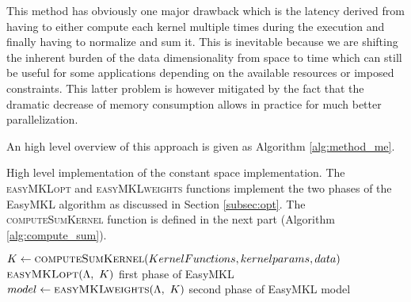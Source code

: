 This method has obviously one major drawback which is the latency derived from
having to either compute each kernel multiple times during the execution and
finally having to normalize and sum it.
This is inevitable because we are shifting the inherent burden of the data dimensionality
from space to time which can still be useful for some applications
depending on the available resources or imposed constraints.
This latter problem is however mitigated by the fact that the dramatic decrease
of memory consumption allows in practice for much better parallelization.

An high level overview of this approach is given as Algorithm \ref{alg:method_me}.
\begin{algorithm}
    \caption{
        High level implementation of the constant space implementation.
        The \textsc{easyMKLopt} and \textsc{easyMKLweights} functions implement
        the two phases of the EasyMKL algorithm as discussed in Section \ref{subsec:opt}.
        The \textsc{computeSumKernel} function is defined in the next part
        (Algorithm \ref{alg:compute_sum}).
    }

    \label{alg:method_me}
    \begin{algorithmic}[1]
                    \State $K \gets \Call{computeSumKernel}{KernelFunctions,kernelparams,data}$
                    \State $\Call{easyMKLopt}{\Lambda,~K}$
                    \Comment first phase of EasyMKL
                    \State $model \gets \Call{easyMKLweights}{\Lambda,~K}$
                    \Comment second phase of EasyMKL
                    \State \Return model
%            

    \end{algorithmic}
\end{algorithm}

